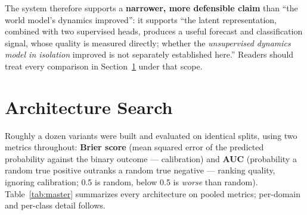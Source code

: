 \documentclass[11pt]{article}
\begin{document}
\noindent The system therefore supports a \textbf{narrower, more defensible claim} than
``the world model's dynamics improved'': it supports ``the latent representation, combined
with two supervised heads, produces a useful forecast and classification signal, whose
quality is measured directly; whether the \emph{unsupervised dynamics model in isolation}
improved is not separately established here.'' Readers should treat every comparison in
Section~\ref{sec:archsearch} under that scope.

\section{Architecture Search}
\label{sec:archsearch}

Roughly a dozen variants were built and evaluated on identical splits, using two metrics
throughout: \textbf{Brier score} (mean squared error of the predicted probability against the
binary outcome --- calibration) and \textbf{AUC} (probability a random true positive outranks a
random true negative --- ranking quality, ignoring calibration; 0.5 is random, below 0.5 is
\emph{worse} than random). Table~\ref{tab:master} summarizes every architecture on pooled
metrics; per-domain and per-class detail follows.
\end{document}
